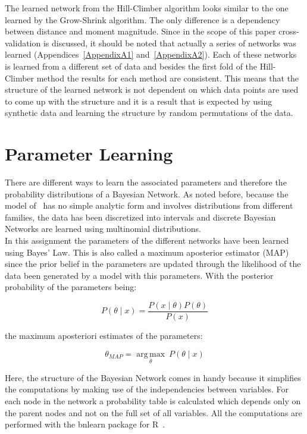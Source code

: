 The learned network from the Hill-Climber algorithm looks similar to the one learned by the Grow-Shrink algorithm. The only difference is a dependency between distance and moment magnitude. Since in the scope of this paper cross-validation is discussed, it should be noted that actually a series of networks was learned (Appendices~\ref{AppendixA1} and~\ref{AppendixA2}). Each of these networks is learned from a different set of data and besides the first fold of the Hill-Climber method the results for each method are consistent. This means that the structure of the learned network is not dependent on which data points are used to come up with the structure and it is a result that is expected by using synthetic data and learning the structure by random permutations of the data. 


\section{Parameter Learning}

There are different ways to learn the associated parameters and therefore the probability distributions of a Bayesian Network. As noted before, because the model of~\cite{boore2003} has no simple analytic form and involves distributions from different families, the data has been discretized into intervals and discrete Bayesian Networks are learned using multinomial distributions.\\
In this assignment the parameters of the different networks have been learned using Bayes' Law. This is also called a maximum aposterior estimator (MAP) since the prior belief in the parameters are updated through the likelihood of the data been generated by a model with this parameters. With the posterior probability of the parameters being: 

\begin{equation*}
P(\theta\mid x) = \dfrac{P(x\mid \theta) P(\theta)}{P(x)}
\end{equation*}

the maximum aposteriori estimates of the parameters: 

\begin{equation*}
\theta_{MAP} = \operatorname*{arg\,max}_\theta~P(\theta\mid x)
\end{equation*}

Here, the structure of the Bayesian Network comes in handy because it simplifies the computations by making use of the independencies between variables. For each node in the network a probability table is calculated which depends only on the parent nodes and not on the full set of all variables. All the computations are performed with the bnlearn package for R~\citep{bnlearn}.

